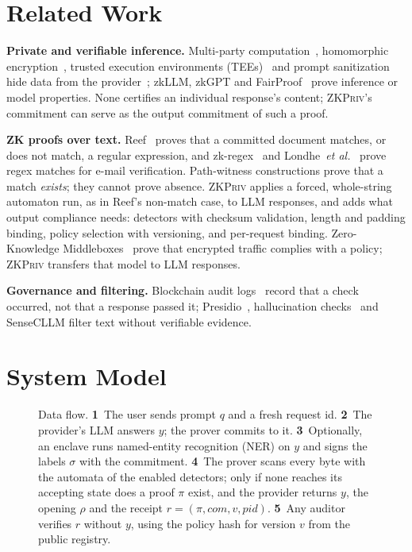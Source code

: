 \documentclass[conference]{IEEEtran}
\newcommand{\sys}{\textsc{ZKPriv}}
\begin{document}
\section{Related Work}

\textbf{Private and verifiable inference.} Multi-party computation~\cite{dong2023puma,gupta2023sigma}, homomorphic encryption~\cite{decastro2025encryptedllm,park2025powerformer}, trusted execution environments (TEEs)~\cite{chrapek2025confidentialllm} and prompt sanitization~\cite{tong2025inferdpt,zeng2025privacyrestore} hide data from the provider~\cite{andreoletti2026privacysurvey}; zkLLM, zkGPT and FairProof~\cite{yadav2024fairproof} prove inference or model properties. None certifies an individual response's content; \sys{}'s commitment can serve as the output commitment of such a proof.

\textbf{ZK proofs over text.} Reef~\cite{reef} proves that a committed document matches, or does not match, a regular expression, and zk-regex~\cite{zkregex} and Londhe~\emph{et al.}~\cite{londhe2026regex} prove regex matches for e-mail verification. Path-witness constructions prove that a match \emph{exists}; they cannot prove absence. \sys{} applies a forced, whole-string automaton run, as in Reef's non-match case, to LLM responses, and adds what output compliance needs: detectors with checksum validation, length and padding binding, policy selection with versioning, and per-request binding. Zero-Knowledge Middleboxes~\cite{zkmiddlebox} prove that encrypted traffic complies with a policy; \sys{} transfers that model to LLM responses.

\textbf{Governance and filtering.} Blockchain audit logs~\cite{jan2025blockchainagentic,ameen2025audittrails} record that a check occurred, not that a response passed it; Presidio~\cite{presidio}, hallucination checks~\cite{selfcheckgpt} and SenseCLLM filter text without verifiable evidence.

\section{System Model}
\label{sec:sysmodel}

\begin{figure}[t]
\centering

\caption{Data flow. \textbf{1}~The user sends prompt $q$ and a fresh request id. \textbf{2}~The provider's LLM answers $y$; the prover commits to it. \textbf{3}~Optionally, an enclave runs named-entity recognition (NER) on $y$ and signs the labels $\sigma$ with the commitment. \textbf{4}~The prover scans every byte with the automata of the enabled detectors; only if none reaches its accepting state does a proof $\pi$ exist, and the provider returns $y$, the opening $\rho$ and the receipt $r=(\pi,\mathit{com},v,\mathit{pid})$. \textbf{5}~Any auditor verifies $r$ without $y$, using the policy hash for version $v$ from the public registry.}
\label{fig:system}
\end{figure}
\end{document}
